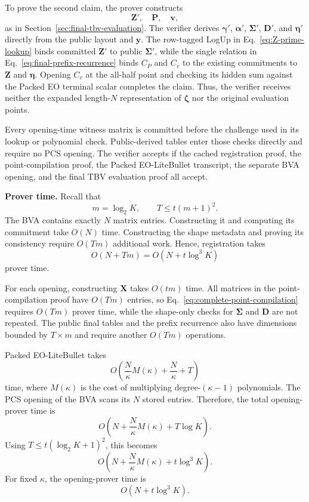 To prove the second claim, the prover constructs
\[
    \bm Z',\quad
    \bm P,\quad
    \bm v,
\]
as in Section~\ref{sec:final-tbv-evaluation}.  The verifier derives
$\bm\gamma'$, $\bm\alpha'$, $\bm\Sigma'$, $\bm D'$, and $\bm\eta'$ directly
from the public layout and $\bm y$.  The row-tagged LogUp in
Eq.~\eqref{eq:Z-prime-lookup} binds committed $\bm Z'$ to public
$\bm\Sigma'$, while the single relation in
Eq.~\eqref{eq:final-prefix-recurrence} binds $C_P$ and $C_v$ to the existing
commitments to $\bm Z$ and $\bm\eta$.  Opening $C_v$ at the all-half point
and checking its hidden sum against the Packed EO terminal scalar completes
the claim.  Thus, the verifier receives neither the expanded length-$N$
representation of $\bm\zeta$ nor the original evaluation points.

Every opening-time witness matrix is committed before the challenge used in
its lookup or polynomial check.  Public-derived tables enter those checks
directly and require no PCS opening.  The verifier accepts if the cached
registration proof, the point-compilation proof, the Packed EO-LiteBullet
transcript, the separate BVA opening, and the final TBV evaluation proof all
accept.

\mysmallskip\noindent
\textbf{Prover time.}
Recall that
\[
    m=\log_2K,
    \qquad
    T\le t(m+1)^2.
\]
The BVA contains exactly $N$ matrix entries.  Constructing it and computing
its commitment take $O(N)$ time.  Constructing the shape metadata and proving
its consistency require $O(Tm)$ additional work.  Hence, registration takes
\[
    O(N+Tm)
    =
    O(N+t\log^3K)
\]
prover time.

For each opening, constructing $\bm X$ takes $O(tm)$ time.  All matrices in
the point-compilation proof have $O(Tm)$ entries, so
Eq.~\eqref{eq:complete-point-compilation} requires $O(Tm)$ prover time, while
the shape-only checks for $\bm\Sigma$ and $\bm D$ are not repeated.  The
public final tables and the prefix recurrence also have dimensions bounded by
$T\times m$ and require another $O(Tm)$ operations.

Packed EO-LiteBullet takes
\[
    O\left(
        \frac{N}{\kappa}M(\kappa)
        +
        \frac{N}{\kappa}
        +
        T
    \right)
\]
time, where $M(\kappa)$ is the cost of multiplying degree-$(\kappa-1)$
polynomials.  The PCS opening of the BVA scans its $N$ stored entries.
Therefore, the total opening-prover time is
\begin{equation}
\label{eq:complete-prover-time}
    O\left(
        N
        +
        \frac{N}{\kappa}M(\kappa)
        +
        T\log K
    \right).
\end{equation}
Using $T\le t(\log_2K+1)^2$, this becomes
\[
    O\left(
        N
        +
        \frac{N}{\kappa}M(\kappa)
        +
        t\log^3K
    \right).
\]
For fixed $\kappa$, the opening-prover time is
\[
    O(N+t\log^3K).
\]

